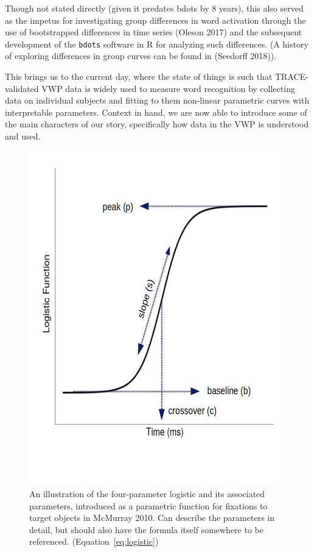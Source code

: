 \documentclass{article}
\newcommand{\xt}{\texttt}%
\begin{document}
Though not stated directly (given it predates bdots by 8 years), this also served as the impetus for investigating group differences in word activation through the use of bootstrapped differences in time series (Oleson 2017) and the subsequent development of the \xt{bdots} software in R for analyzing such differences. (A history of exploring differences in group curves can be found in (Seedorff 2018)).

This brings us to the current day, where the state of things is such that TRACE-validated VWP data is widely used to measure word recognition by collecting data on individual subjects and fitting to them non-linear parametric curves with interpretable parameters. Context in hand, we are now able to introduce some of the main characters of our story, specifically how data in the VWP is understood and used. 



\begin{figure}[h]
\centering
\includegraphics[scale=0.4]{logistic_label.png}
\caption{An illustration of the four-parameter logistic and its associated parameters, introduced as a parametric function for fixations to target objects in McMurray 2010. Can describe the parameters in detail, but should also have the formula itself somewhere to be referenced. (Equation~\ref{eq:logistic})}
\label{fig:logistic_definition}
\end{figure}
\end{document}
